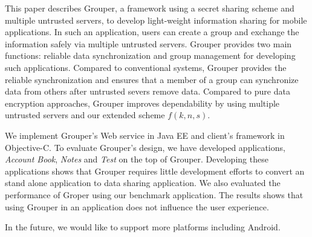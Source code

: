 \documentclass[twocolumn,10pt]{article}
\begin{document}
This paper describes Grouper, a framework using a secret sharing scheme and multiple untrusted servers, to develop light-weight information sharing for mobile applications.
In such an application, users can create a group and exchange the information safely via multiple untrusted servers.
Grouper provides two main functions: reliable data synchronization and group management for developing such applications.
Compared to conventional systems, Grouper provides the reliable synchronization and ensures that a member of a group can synchronize data from others after untrusted severs remove data.
Compared to pure data encryption approaches, Grouper improves dependability by using multiple untrusted servers and our extended scheme $f(k, n, s)$.

We implement Grouper's Web service in Java EE and client's framework in Objective-C. 
To evaluate Grouper's design, we have developed applications, \emph{Account Book}, \emph{Notes} and \emph{Test} on the top of Grouper.
Developing these applications shows that Grouper requires little development efforts to convert an stand alone application to data sharing application.
We also evaluated the performance of Groper using our benchmark application.
The results shows that using Grouper in an application does not influence the user experience.

In the future, we would like to support more platforms including Android.


{
	\footnotesize
	
}
\end{document}
